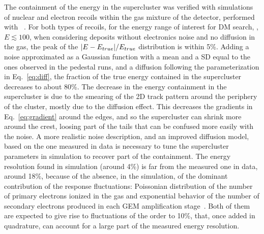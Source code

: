 The containment of the energy in the supercluster was verified
with simulations of nuclear and electron recoils  within
the gas mixture of the \lemon detector, performed with
\SRIM~\cite{bib:srim}.  For both types of recoils,
for the energy range of interest for DM search, \ie, $E \lesssim
100$\keV, when considering deposits without electronics noise and no
diffusion in the gas, the peak of the $\vert E-E_{true} \vert/E_{true}$
distribution is within 5\%. Adding a noise approximated as a Gaussian
function with a mean and a SD equal to the ones observed in the
pedestal runs, and a diffusion following the parameterization in
Eq.~\ref{eq:diff}, the fraction of the true energy contained in the
supercluster decreases to about 80\%.
%
The decrease in the energy containment in the supercluster is due to
the smearing of the 2D track pattern around the periphery of the
cluster, mostly due to the diffusion effect.  This decreases the
gradients in Eq.~\ref{eq:gradient} around the edges, and so the
supercluster can shrink more around the crest, loosing part of the
tails that can be confused more easily with the noise.  A more
realistic noise description, and an improved diffusion model, based on
the one measured in data is necessary to tune the supercluster
parameters in simulation to recover part of the containment.  The
energy resolution found in simulation (around 4\%) is far from the
measured one in data, around 18\%, because of the absence, in the
simulation, of the dominant contribution of the response fluctuations:
Poissonian distribution of the number of primary electrons ionized in
the gas and exponential behavior of the number of secondary electrons
produced in each GEM amplification stage~\cite{bib:thesis}. Both of
them are expected to give rise to fluctuations of the order to 10\%,
that, once added in quadrature, can account for a large part of the
measured energy resolution.

